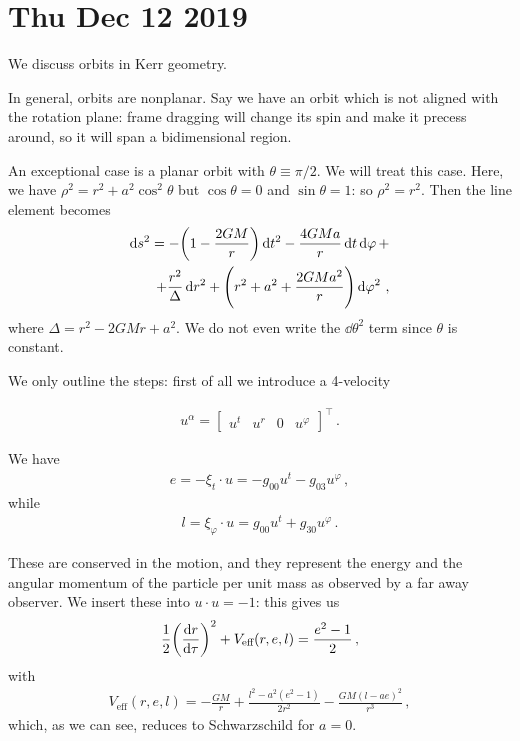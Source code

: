 \documentclass[main.tex]{subfiles}
\begin{document}
\section*{Thu Dec 12 2019}

We discuss orbits in Kerr geometry. 

In general, orbits are nonplanar. Say we have an orbit which is not aligned with the rotation plane: frame dragging will change its spin and make it precess around, so it will span a bidimensional region. 

An exceptional case is a planar orbit with \(\theta \equiv \pi /2\). 
We will treat this case. Here, we have \(\rho^2 = r^2 + a^2 \cos^2 \theta \) but \(\cos \theta =0\) and \(\sin \theta = 1\): so \(\rho^2 = r^2\). Then the line element becomes 
%
\begin{align}
  \begin{split}
      \dd{s^2} = - \qty(1 - \frac{2GM}{r}) \dd{t^2} 
      - \frac{4GMa}{r} \dd{t} \dd{\varphi } + \\
      + \frac{r^2}{\Delta } \dd{r^2} + \qty(r^2+ a^2 + \frac{2GMa^2}{r}) \dd{\varphi^2}
      \,,
  \end{split}
\end{align}
%
where \(\Delta = r^2 - 2GMr + a^2\). We do not even write the \(\dd{\theta^2}\) term since \(\theta \) is constant. 

We only outline the steps: first of all we introduce a 4-velocity 


%
\begin{align}
    u^{\alpha } = \left[\begin{array}{cccc}
        u^{t} & u^{r} & 0 & u^{\varphi }
    \end{array}\right]^{\top}
\,.
\end{align}

We have 
%
\begin{align}
  e = - \xi_{t} \cdot u = - g_{00} u^{t} - g_{03} u^{\varphi }
\,,
\end{align}
%
while 
%
\begin{align}
  l = \xi_{\varphi } \cdot u = g_{00} u^{t} + g_{30} u^{\varphi }
\,.
\end{align}

These are conserved in the motion, and they represent the energy and the angular momentum of the particle per unit mass as observed by a far away observer.
We insert these into \(u \cdot u = -1\): this gives us 
%
\begin{align}
 \frac{1}{2} \qty(\dv{r}{\tau })^2 + V _{\text{eff}} (r, e, l) = \frac{e^2 - 1}{2}
\,,
\end{align}
%
with 
%
\begin{align}
  V _{\text{eff}} (r, e, l)  = -\frac{GM}{r} + \frac{l^2 - a^2 (e^2-1)}{2r^2} - \frac{GM(l - ae)^2}{r^3} 
\,,
\end{align}
%
which, as we can see, reduces to Schwarzschild for \(a=0\). 
\end{document}
